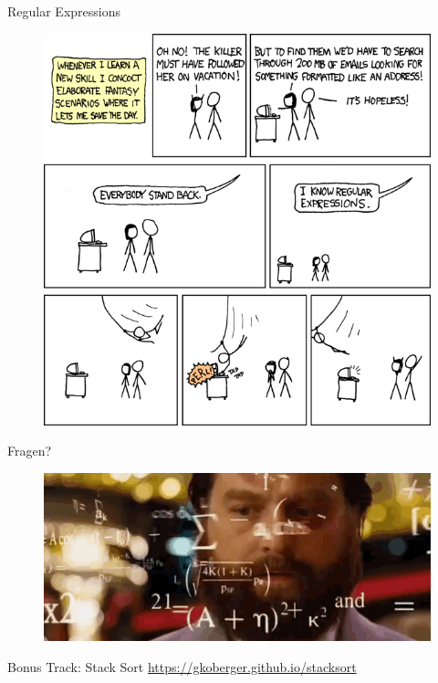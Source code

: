 \documentclass[18pt]{beamer}
\begin{document}
\begin{frame}{Regular Expressions}
    \begin{figure}
        \includegraphics[scale=.3]{img/regular_expressions.png}
    \end{figure}
\end{frame}

\appendix
\beginbackup

\begin{frame}{Fragen?}
    \begin{figure}
        \includegraphics[scale=.6]{img/formulas.png}
    \end{figure}
\end{frame}

\begin{frame}{Bonus Track: Stack Sort}
    \url{https://gkoberger.github.io/stacksort}
\end{frame}
\end{document}
